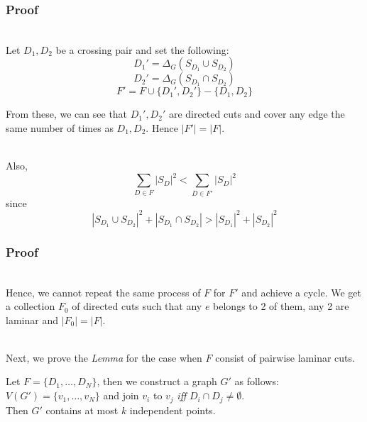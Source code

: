 \documentclass[8pt]{beamer}
\begin{document}
\begin{frame}
\frametitle{Proof}
\begin{block}\\
Let $D_1, D_2$ be a crossing pair and set the following:
$$D_1'=\Delta_G(S_{D_1} \cup S_{D_2})$$
$$D_2'=\Delta_G(S_{D_1} \cap S_{D_2})$$
$$F'=F\cup \{D_1',D_2' \}-\{D_1,D_2 \}$$

From these, we can see that $D_1', D_2'$ are directed cuts and cover any edge the same number of times as $D_1, D_2$. Hence $|F'| = |F|$. 
\end{block}

\begin{block}\\
Also,
$$\underset{D\in F}{\sum}|S_D|^2 < \underset{D\in F'}{\sum}|S_D|^2$$
since 
$$|S_{D_1}\cup S_{D_2}|^2 + |S_{D_1}\cap S_{D_2}|>|S_{D_1}|^2+|S_{D_2}|^2$$
\end{block}

\end{frame}

\begin{frame}
\frametitle{Proof}
\begin{block}\\
Hence, we cannot repeat the same process of $F$ for $F'$ and achieve a cycle.
We get a collection $F_0$ of directed cuts such that any $e$ belongs to 2 of them, any 2 are laminar and $|F_0| = |F|$. 
\end{block}

\begin{block}\\
Next, we prove the \textit{Lemma} for the case when $F$ consist of pairwise laminar cuts. 
\end{block}

\begin{block}

Let $F=\{D_1,\dots,D_N\}$, then we construct a graph $G'$ as follows:\\
$V(G')=\{v_1,\dots,v_N\}$ and join $v_i$ to $v_j$ \textit{iff} $D_i \cap D_j \ne \emptyset$.\\
Then $G'$ contains at most $k$ independent points. 
\end{block}
\end{frame}
\end{document}
